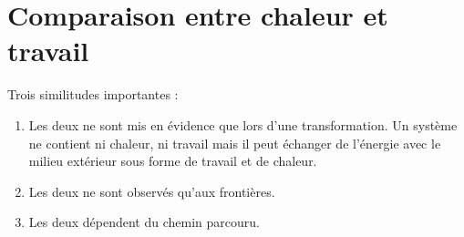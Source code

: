 \section{Comparaison entre chaleur et travail}
Trois similitudes importantes :
\begin{enumerate}
	\item Les deux ne sont mis en évidence que lors d'une transformation. 
	      Un système ne contient ni chaleur, ni travail mais il peut échanger 
	      de l'énergie avec le milieu extérieur sous forme de travail et de chaleur.
	\item Les deux ne sont observés qu'aux frontières.
	\item Les deux dépendent du chemin parcouru.
\end{enumerate}


